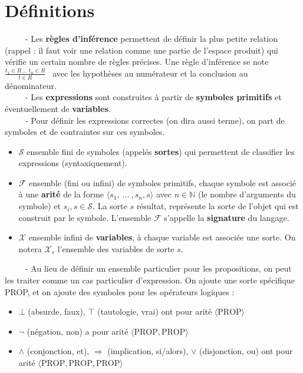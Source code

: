 \documentclass[11pt,a4paper]{article}
\begin{document}
\section{Définitions}

\ \ \ \ \ - Les \textbf{règles d'inférence} permettent de définir la plus petite relation (rappel : il faut voir une relation comme une partie de l'espace produit) qui vérifie un certain nombre de règles précises. Une règle d'inférence se note { \Large $\frac{t_1 \in R \ \dots \ t_n \in R}{t \in R}$ } \ avec les hypothèses au numérateur et la conclusion au dénominateur. \\

\ \ \ \ \ - Les \textbf{expressions} sont construites à partir de \textbf{symboles primitifs} et éventuellement de \textbf{variables}. \\

\ \ \ \ \ - Pour définir les expressions correctes (on dira aussi terme), on part de
symboles et de contraintes sur ces symboles.
\begin{itemize}
\item{} $\mathcal{S}$ ensemble fini de symboles (appelés \textbf{sortes}) qui permettent de classifier les expressions (syntaxiquement).
\item{} $\mathcal{F}$ ensemble (fini ou infini) de symboles primitifs, chaque symbole est associé à une \textbf{arité} de la forme $ \langle s_1, \ \dots	\ , s_n, s \rangle$ avec $n \in \mathbb{N}$ (le nombre d’arguments du symbole) et $s_i, s \in \mathcal{S}$. La sorte $s$ résultat, représente la sorte de l’objet qui est construit par le symbole. L’ensemble $\mathcal{F}$ s’appelle la \textbf{signature} du langage.
\item{} $ \mathcal{X}$ ensemble infini de \textbf{variables}, à chaque variable est associée une sorte.
On notera $\mathcal{X}_s$ l’ensemble des variables de sorte $s$.
\end{itemize}

\ \ \ \ \ - Au lieu de définir un ensemble particulier pour les propositions, on peut les traiter comme un cas particulier d’expression. On ajoute une sorte spécifique PROP, et on ajoute des symboles pour les opérateurs logiques : 
\begin{itemize}
\item $\bot$ (absurde, faux), $\top$ (tautologie, vrai) ont pour arité $\langle \text{PROP} \rangle$ 
\item $\lnot$  (négation, non) a pour arité $ \langle \text{PROP}, \text{PROP} \rangle  $
\item $\land$ (conjonction, et), $\Rightarrow$ (implication, si/alors), $\lor$ (disjonction, ou) ont pour arité $\langle \text{PROP}, \text{PROP}, \text{PROP} \rangle $
\end{itemize}
\end{document}
